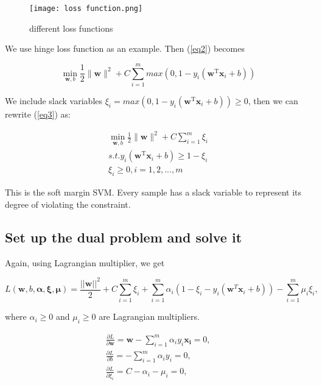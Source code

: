 \documentclass{article}
\begin{document}
\begin{figure}[H]
\centering
\texttt{[image: loss function.png]}
\caption{different loss functions}
\label{fig4}
\end{figure}

We use hinge loss function as an example. Then (\ref{eq2}) becomes 

\begin{equation} \label{eq3}
\min _{\boldsymbol{w}, b} \frac{1}{2}\|\boldsymbol{w}\|^2+C \sum_{i=1}^m max(0, 1-y_i\left(\boldsymbol{w}^{\mathrm{T}} \boldsymbol{x}_i+b\right))
\end{equation}

We include slack variables $\xi_i = max(0, 1-y_i\left(\boldsymbol{w}^{\mathrm{T}} \boldsymbol{x}_i+b\right)) \geq 0$, then we can rewrite (\ref{eq3}) as:

\begin{gather*}
\min _{\boldsymbol{w}, b} \frac{1}{2}\|\boldsymbol{w}\|^2+C \sum_{i=1}^m \xi_i \\
s.t. y_i\left(\boldsymbol{w}^{\mathrm{T}} \boldsymbol{x}_i+b\right) \geq 1-\xi_i \\
\xi_i \geq 0, i = 1,2,...,m
\end{gather*}

This is the soft margin SVM. Every sample has a slack variable to represent its degree of violating the constraint.

\subsection{Set up the dual problem and solve it}

Again, using Lagrangian multiplier, we get

\begin{center}
\begin{equation} \label{eq4}
L(\boldsymbol{w}, b, \boldsymbol{\alpha}, \boldsymbol{\xi}, \boldsymbol{\mu}) = \frac{||\boldsymbol{w}||^2}{2} + C \sum_{i=1}^m \xi_i + \sum_{i=1}^{m}{\alpha_i(1-\xi_i-y_i(\boldsymbol{w}^T\boldsymbol{x}_i + b))} - \sum_{i=1}^{m}{\mu_i \xi_i},
\end{equation}
\end{center}

where $\alpha_i \geq 0$ and $\mu_i \geq 0$ are Lagrangian multipliers.

\begin{gather*}
\frac{\partial L}{\partial \boldsymbol{w}} = \boldsymbol{w} - \sum_{i=1}^{m}{\alpha_i y_i \boldsymbol{x_i}} = 0, \\
\frac{\partial L}{\partial b} = - \sum_{i=1}^{m}{\alpha_i y_i} = 0, \\
\frac{\partial L}{\partial \xi_i} = C - \alpha_i - \mu_i = 0,
\end{gather*}
\end{document}

